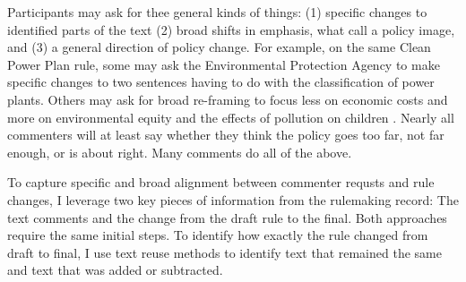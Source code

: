 
Participants may ask for thee general kinds of things: (1) specific changes to identified parts of the text (2) broad shifts in emphasis, what \citet{Jones2005} call a policy image, and (3) a general direction of policy change. For example, on the same Clean Power Plan rule, some may ask the Environmental Protection Agency to make specific changes to two sentences having to do with the classification of power plants. %
Others may ask for broad re-framing to focus less on economic costs and more on environmental equity and the effects of pollution on children \citep{Rinfret2011}.
Nearly all commenters will at least say whether they think the policy goes too far, not far enough, or is about right. Many comments do all of the above. 

To capture specific and broad alignment between commenter requsts and rule changes, I leverage two key pieces of information from the rulemaking record: The text comments and the change from the draft rule to the final. %
Both approaches require the same initial steps. To identify how exactly the rule changed from draft to final, I use text reuse methods to identify text that remained the same and text that was added or subtracted. 





